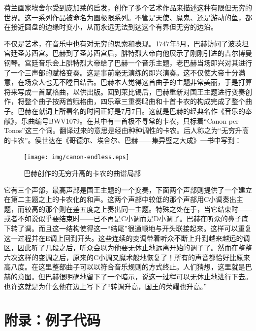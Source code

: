 \documentclass{article}
\begin{document}
荷兰画家埃舍尔受到庞加莱的启发，创作了多个艺术作品来描述这种有限但无穷的世界。这一系列作品被命名为圆极限系列。不管是天使、魔鬼、还是游动的鱼，都在接近圆盘的边缘时变小，从而永远无法到达这个有界但无穷的边沿。

不仅是艺术，在音乐中也有对无穷的思索和表现。1747年5月，巴赫访问了波茨坦宫廷圣苏西宫。巴赫到了圣苏西宫后，腓特烈大帝向他展示了刚刚引进的吉尔博曼钢琴。宫廷音乐会上腓特烈大帝给了巴赫一个音乐主题，老巴赫当场即兴对其进行了一个三声部的赋格变奏。这是事前毫无演练的即兴演奏。这不仅使大帝十分满意，在场众人也无不瞠目结舌。巴赫本人觉得这首曲子的主题非常美丽，于是打算将来写成一首赋格曲，以供出版。回到莱比锡后，巴赫重新对国王主题进行变奏创作，将整个曲子按两首赋格曲，四乐章三重奏鸣曲和十首卡农的构成完成了整个曲子。巴赫在献词上所署名的时间正好是7月7日。这就是巴赫的经典名作《音乐的奉献》，乐曲编号BWV1079。在其中有一首极不寻常的卡农，只标着“Canon per Tonos”这三个词。翻译过来的意思是经由种种调性的卡农。后人称之为“无穷升高的卡农”。侯世达在《哥德尔、埃舍尔、巴赫——集异璧之大成》一书中写到：

\begin{figure}[htbp]
 \centering
 \texttt{[image: img/canon-endless.eps]}
 \captionsetup{labelformat=empty}
 \caption{巴赫创作的无穷升高的卡农的曲谱局部}
 \label{fig:canon-endless}
\end{figure}

它有三个声部，最高声部是国王主题的一个变奏，下面两个声部则提供了一个建立在第二主题之上的卡农化的和声。这两个声部中较低的那个声部用C小调奏出主题，而较高的那个则在差五度之上奏出同一主题。特殊之处在于，当它结束时——或者不如说似乎要结束时——已不再是C小调而是D小调了。巴赫在听众的鼻子底下转了调。而且这一结构使得这一“结尾”很通顺地与开头联接起来。这样可以重复这一过程并在E调上回到开头。这些连续的变调带着听众不断上升到越来越远的调区，因此听了几段之后，听众会以为他要无休止地远离开始的调子了。然而在整整六次这样的变调之后，原来的C小调又魔术般地恢复了！所有的声音都恰好比原来高八度。在这里整部曲子可以以符合音乐规则的方式终止。人们猜想，这里就是巴赫的意图。但巴赫很明确地留下了一个暗示，说这一过程可以无休止地进行下去。也许这就是为什么他在边上写下了“转调升高，国王的荣耀也升高。”\cite{GEB}

\begin{Exercise}
\end{Exercise}

\section{附录：例子代码}
\end{document}
